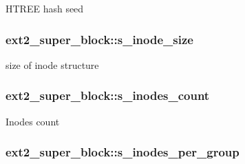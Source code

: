 H\-T\-R\-E\-E hash seed \hypertarget{structext2__super__block_a9a1ee9cd5f706fa2e753a4c781ebae73}{
\subsubsection[{s\-\_\-inode\-\_\-size}]{ ext2\-\_\-super\-\_\-block\-::s\-\_\-inode\-\_\-size}}\label{structext2__super__block_a9a1ee9cd5f706fa2e753a4c781ebae73}
size of inode structure \hypertarget{structext2__super__block_a2ea20f821c0ddc19b0adc7d1b8d0685d}{
\subsubsection[{s\-\_\-inodes\-\_\-count}]{ ext2\-\_\-super\-\_\-block\-::s\-\_\-inodes\-\_\-count}}\label{structext2__super__block_a2ea20f821c0ddc19b0adc7d1b8d0685d}
Inodes count \hypertarget{structext2__super__block_a4b417c308a43cfd8d744c3fdd19832af}{
\subsubsection[{s\-\_\-inodes\-\_\-per\-\_\-group}]{ ext2\-\_\-super\-\_\-block\-::s\-\_\-inodes\-\_\-per\-\_\-group}}\label{structext2__super__block_a4b417c308a43cfd8d744c3fdd19832af}
